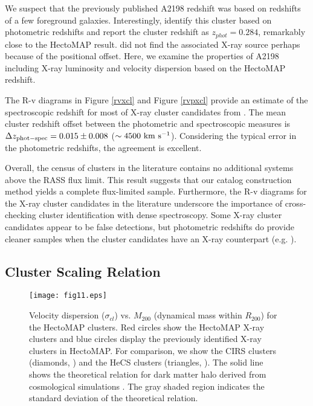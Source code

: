 \documentclass[iop, apj]{emulateapj}
\newcommand{\kms}{\rm km~s^{-1}}
\begin{document}
We suspect that the previously published A2198 redshift was
 based on redshifts of a few foreground galaxies. 
Interestingly, \citet{Wen09} identify this cluster 
 based on photometric redshifts
 and report the cluster redshift as $z_{phot} = 0.284$, 
 remarkably close to the HectoMAP result.
\citet{Wen09} did not find the associated X-ray source 
 perhaps because of the positional offset.
Here, we examine the properties of A2198 
 including X-ray luminosity and velocity dispersion
 based on the HectoMAP redshift.  

The R-v diagrams in Figure \ref{rvxcl} and Figure \ref{rvpxcl}
 provide an estimate of the spectroscopic redshift for most of X-ray cluster candidates 
 from \citet{Wen09}.
The mean cluster redshift offset between the photometric and spectroscopic measures
 is $\Delta z_{{\rm phot} - {\rm spec}} = 0.015 \pm 0.008$ ($\sim 4500~\kms$). 
Considering the typical error in the photometric redshifts,
 the agreement is excellent.
 
Overall, the census of clusters in the literature 
 contains no additional systems above the RASS flux limit. 
This result suggests that 
 our catalog construction method yields a complete flux-limited sample. 
Furthermore, the R-v diagrams for the X-ray cluster candidates in the literature 
 underscore the importance of cross-checking cluster identification with dense spectroscopy. 
Some X-ray cluster candidates appear to be false detections, 
 but photometric redshifts do provide cleaner samples when the cluster candidates have an X-ray counterpart
 (e.g. \citealp{Wen09}).  

\subsection{Cluster Scaling Relation}\label{scl}

\begin{figure}
\centering
\texttt{[image: fig11.eps]}
\caption{
Velocity dispersion ($\sigma_{cl}$) vs. $M_{200}$ (dynamical mass within $R_{200}$)
 for the HectoMAP clusters. 
Red circles show the HectoMAP X-ray clusters and 
 blue circles display the previously identified X-ray clusters in HectoMAP. 
For comparison, 
 we show
 the CIRS clusters (diamonds, \citealp{Rines06}) and 
 the HeCS clusters (triangles, \citealp{Rines13}). 
The solid line shows the theoretical relation for dark matter halo 
 derived from cosmological simulations \citep{Evrard08}.
The gray shaded region indicates the standard deviation of the theoretical relation.}
\label{msig}
\end{figure}
\end{document}

